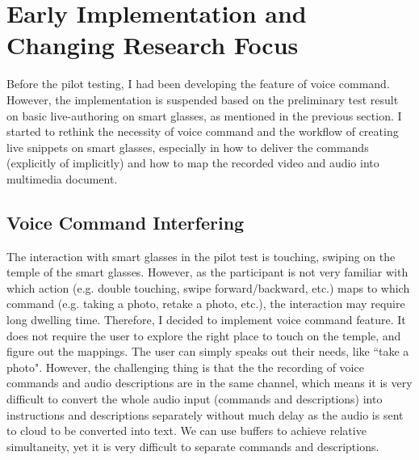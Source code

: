 \documentclass[fyp]{socreport}
\begin{document}
\section{Early Implementation and Changing Research Focus}
Before the pilot testing, I had been developing the feature of voice command. However, the implementation is suspended based on the preliminary test result on basic live-authoring on smart glasses, as mentioned in the previous section. I started to rethink the necessity of voice command and the workflow of creating live snippets on smart glasses, especially in how to deliver the commands (explicitly of implicitly) and how to map the recorded video and audio into multimedia document.

\subsection{Voice Command Interfering}
The interaction with smart glasses in the pilot test is touching, swiping on the temple of the smart glasses. However, as the participant is not very familiar with which action (e.g. double touching, swipe forward/backward, etc.) maps to which command (e.g. taking a photo, retake a photo, etc.), the interaction may require long dwelling time. Therefore, I decided to implement voice command feature. It does not require the user to explore the right place to touch on the temple, and figure out the mappings. The user can simply speaks out their needs, like ``take a photo". However, the challenging thing is that the the recording of voice commands and audio descriptions are in the same channel, which means it is very difficult to convert the whole audio input (commands and descriptions) into instructions and descriptions separately without much delay as the audio is sent to cloud to be converted into text. We can use buffers to achieve relative simultaneity, yet it is very difficult to separate commands and descriptions. 
\end{document}
